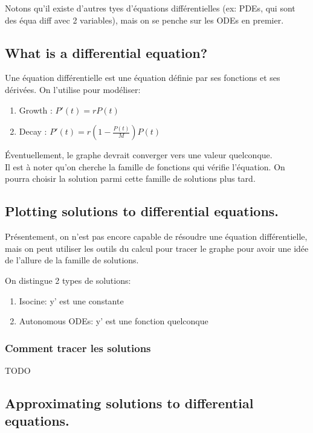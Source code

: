 \documentclass{article}
\begin{document}
Notons qu'il existe d'autres tyes d'équations différentielles (ex:
PDEs, qui sont des équa diff avec 2 variables), mais on se penche sur les
ODEs en premier.

\subsection{What is a differential equation? }

Une équation différentielle est une équation définie par ses fonctions
et ses dérivées. On l'utilise pour modéliser:
\begin{enumerate}
    \item Growth : $ P'(t) = r P(t)$
    \item Decay : $ P'(t) = r (1- \frac{P(t)}{M})P(t)$
\end{enumerate}

Éventuellement, le graphe devrait converger vers une valeur quelconque.\\

Il est à noter qu'on cherche la famille de fonctions qui vérifie l'équation.
 On pourra choisir la solution parmi cette famille de solutions plus tard.

\subsection{Plotting solutions to differential equations. }

Présentement, on n'est pas encore capable de résoudre une équation
différentielle, mais on peut utiliser les outils du calcul pour tracer
le graphe pour avoir une idée de l'allure de la famille de solutions.

On distingue 2 types de solutions:
\begin{enumerate}
    \item Isocine: y' est une constante
    \item Autonomous ODEs: y' est une fonction quelconque
\end{enumerate}

\subsubsection{Comment tracer les solutions}

TODO

\subsection{Approximating solutions to differential equations. }
\end{document}
